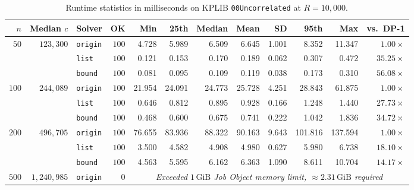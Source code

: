 \documentclass[10pt, a4paper]{article}
\newcommand{\code}[1]{\texttt{\color{primary!90!black}#1}}
\begin{document}
\vspace{-0.2em}
\begin{table}[H]
\centering
\caption{Runtime statistics in milliseconds on KPLIB \code{00Uncorrelated} at $R = 10{,}000$.}
\label{tab:r10000}
\renewcommand{\arraystretch}{0.95}
\setlength{\tabcolsep}{3.7pt}
\footnotesize
\begin{tabular}{@{}rrlrrrrrrrrr@{}}
\toprule
\textbf{\color{primary}$n$} & \textbf{\color{primary}Median $c$} & \textbf{\color{primary}Solver} & \textbf{\color{primary}OK} & \textbf{\color{primary}Min} & \textbf{\color{primary}25th} & \textbf{\color{primary}Median} & \textbf{\color{primary}Mean} & \textbf{\color{primary}SD} & \textbf{\color{primary}95th} & \textbf{\color{primary}Max} & \textbf{\color{primary}vs.\ DP-1} \\
\midrule
\multirow{3}{*}{$50$} & \multirow{3}{*}{$123{,}300$}
  & \code{origin} & $100$ &   4.728 &   5.989 &   6.509 &   6.645 &  1.001 &   8.352 &  11.347 & $1.00\times$ \\
& & \code{list}   & $100$ &   0.121 &   0.153 &   0.170 &   0.189 &  0.062 &   0.307 &   0.472 & $\mathbf{35.25\times}$ \\
& & \code{bound}  & $100$ &   0.081 &   0.095 &   0.109 &   0.119 &  0.038 &   0.173 &   0.310 & $\mathbf{56.08\times}$ \\
\midrule
\multirow{3}{*}{$100$} & \multirow{3}{*}{$244{,}089$}
  & \code{origin} & $100$ &  21.954 &  24.091 &  24.773 &  25.728 &  4.251 &  28.843 &  61.875 & $1.00\times$ \\
& & \code{list}   & $100$ &   0.646 &   0.812 &   0.895 &   0.928 &  0.166 &   1.248 &   1.440 & $\mathbf{27.73\times}$ \\
& & \code{bound}  & $100$ &   0.468 &   0.600 &   0.675 &   0.741 &  0.222 &   1.042 &   1.836 & $\mathbf{34.72\times}$ \\
\midrule
\multirow{3}{*}{$200$} & \multirow{3}{*}{$496{,}705$}
  & \code{origin} & $100$ &  76.655 &  83.936 &  88.322 &  90.163 &  9.643 & 101.816 & 137.594 & $1.00\times$ \\
& & \code{list}   & $100$ &   3.500 &   4.582 &   4.908 &   4.980 &  0.627 &   5.980 &   6.738 & $\mathbf{18.10\times}$ \\
& & \code{bound}  & $100$ &   4.563 &   5.595 &   6.162 &   6.363 &  1.090 &   8.611 &  10.704 & $\mathbf{14.17\times}$ \\
\midrule
\multirow{3}{*}{$500$} & \multirow{3}{*}{$1{,}240{,}985$}
  & \code{origin} &   $0$ & \multicolumn{8}{c}{\color{textmuted}\itshape Exceeded $1\,\text{GiB}$ Job Object memory limit, $\approx 2.31\,\text{GiB}$ required} \\

\end{tabular}
\end{table}
\end{document}
